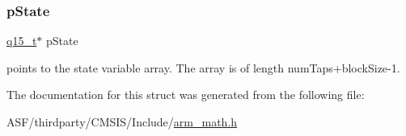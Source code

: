 \subsubsection{\texorpdfstring{pState}{pState}}
{\footnotesize\ttfamily \mbox{\hyperlink{arm__math_8h_ab5a8fb21a5b3b983d5f54f31614052ea}{q15\+\_\+t}}$\ast$ p\+State}

points to the state variable array. The array is of length num\+Taps+block\+Size-\/1. 

The documentation for this struct was generated from the following file\+:\begin{DoxyCompactItemize}
\item 
A\+S\+F/thirdparty/\+C\+M\+S\+I\+S/\+Include/\mbox{\hyperlink{arm__math_8h}{arm\+\_\+math.\+h}}\end{DoxyCompactItemize}
